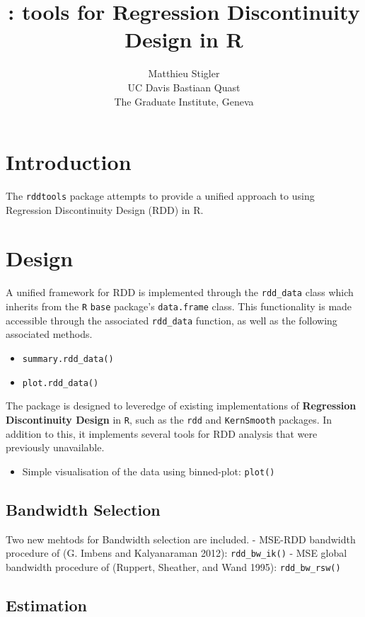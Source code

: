 \documentclass[article]{jss}
\author{
Matthieu Stigler\\UC Davis \And Bastiaan Quast\\The Graduate Institute, Geneva
}
\title{\pkg{rddtools}: tools for Regression Discontinuity Design in R}
\begin{document}
\section{Introduction}\label{introduction}

The \texttt{rddtools} package attempts to provide a unified approach to
using Regression Discontinuity Design (RDD) in R.

\section{Design}\label{design}

A unified framework for RDD is implemented through the
\texttt{rdd\_data} class which inherits from the \texttt{R}
\texttt{base} package's \texttt{data.frame} class. This functionality is
made accessible through the associated \texttt{rdd\_data} function, as
well as the following associated methods.

\begin{itemize}
\itemsep1pt\parskip0pt
\item
  \texttt{summary.rdd\_data()}
\item
  \texttt{plot.rdd\_data()}
\end{itemize}

The package is designed to leveredge of existing implementations of
\textbf{Regression Discontinuity Design} in \texttt{R}, such as the
\texttt{rdd} and \texttt{KernSmooth} packages. In addition to this, it
implements several tools for RDD analysis that were previously
unavailable.

\begin{itemize}
\itemsep1pt\parskip0pt
\item
  Simple visualisation of the data using binned-plot: \texttt{plot()}
\end{itemize}

\subsection{Bandwidth Selection}\label{bandwidth-selection}

Two new mehtods for Bandwidth selection are included. - MSE-RDD
bandwidth procedure of (G. Imbens and Kalyanaraman 2012):
\texttt{rdd\_bw\_ik()} - MSE global bandwidth procedure of (Ruppert,
Sheather, and Wand 1995): \texttt{rdd\_bw\_rsw()}

\subsection{Estimation}\label{estimation}
\end{document}
